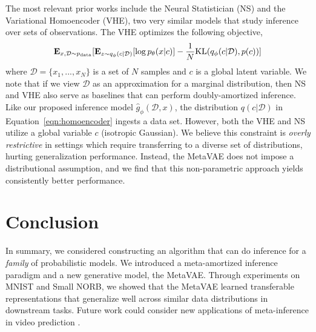 The most relevant prior works include the Neural Statistician \cite{edwards2016towards} (NS) and the Variational Homoencoder \cite{hewitt2018variational} (VHE), two very similar models that study inference over sets of observations. The VHE optimizes the following objective, 
\begin{equation}
    \mathbf{E}_{x,\mathcal{D} \sim p_{\textup{data}}}[\mathbf{E}_{z \sim q_\phi(c|\mathcal{D})}[\log p_\theta(x|c)] - \frac{1}{N}\textup{KL}(q_\phi(c|\mathcal{D}), p(c))]
    \label{eqn:homoencoder}
\end{equation}
where $\mathcal{D} = \{x_1, ..., x_N\}$ is a set of $N$ samples and $c$ is a global latent variable. 
We note that if we view $\mathcal{D}$ as an approximation for a marginal distribution, then NS and VHE also serve as baselines that can perform doubly-amortized inference. Like our proposed inference model $\hat{g}_\phi(\mathcal{D}, x)$, the distribution $q(c|\mathcal{D})$ in Equation~\ref{eqn:homoencoder} ingests a data set.
However, both the VHE and NS utilize a global variable $c$ (isotropic Gaussian). 
We believe this constraint is \textit{overly restrictive} in settings which require transferring to a diverse set of distributions, hurting generalization performance. Instead, the MetaVAE does not impose a distributional assumption, and we find that this non-parametric approach yields consistently better performance. 

\section{Conclusion}
In summary, we considered constructing an algorithm that can do inference for a  \textit{family} of probabilistic models. We introduced a meta-amortized inference paradigm and a new generative model, the MetaVAE. 
Through experiments on MNIST and Small NORB, we showed that the MetaVAE learned transferable representations that generalize well across similar data distributions in downstream tasks. 
Future work could consider new applications of meta-inference in video prediction \cite{ramanathan2015learning}.